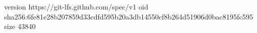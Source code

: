 version https://git-lfs.github.com/spec/v1
oid sha256:6fe81e28b207859d33cdfd595b20a3db14550cf8b264d51906d0bac8195fc595
size 43840
